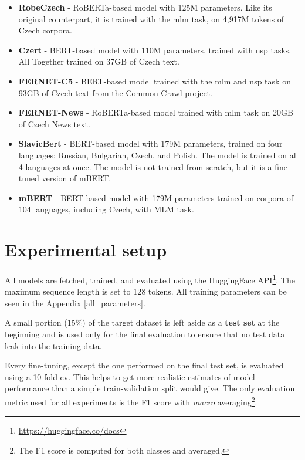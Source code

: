 \begin{itemize}
    \item \textbf{RobeCzech} \cite{strakarobeczech} - RoBERTa-based model with 125M parameters. Like its original counterpart, it is trained with the \gls{mlm} task, on 4,917M tokens of Czech corpora.
    \item \textbf{Czert} \cite{sido-etal-2021-czert} - BERT-based model with 110M parameters, trained with \gls{nsp} tasks. All Together trained on 37GB of Czech text. 
    \item \textbf{FERNET-C5} \cite{lehevcka2021comparison} - BERT-based model trained with the \gls{mlm} and \gls{nsp} task on 93GB of Czech text from the Common Crawl project.
    \item \textbf{FERNET-News} \cite{lehevcka2021comparison} - RoBERTa-based model trained with \gls{mlm} task on 20GB of Czech News text.
    \item \textbf{SlavicBert} \cite{arkhipov2019tuning} - BERT-based model with 179M parameters, trained on four languages: Russian, Bulgarian, Czech, and Polish. The model is trained on all 4 languages at once. The model is not trained from scratch, but it is a fine-tuned version of mBERT.
    \item \textbf{mBERT} \cite{devlin2019bert} - BERT-based model with 179M parameters trained on corpora of 104 languages, including Czech, with MLM task.
\end{itemize}







\section{Experimental setup}
All models are fetched, trained, and evaluated using the HuggingFace API\footnote{\url{https://huggingface.co/docs}}. The maximum sequence length is set to 128 tokens. All training parameters can be seen in the Appendix \ref{all_parameters}.

A small portion (15\%) of the target dataset is left aside as a \textbf{test set} at the beginning and is used only for the final evaluation to ensure that no test data leak into the training data.

Every fine-tuning, except the one performed on the final test set, is evaluated using a 10-fold \gls{cv}. This helps to get more realistic estimates of model performance than a simple train-validation split would give. The only evaluation metric used for all experiments is the F1 score with \textit{macro} averaging\footnote{The F1 score is computed for both classes and averaged.}. 

